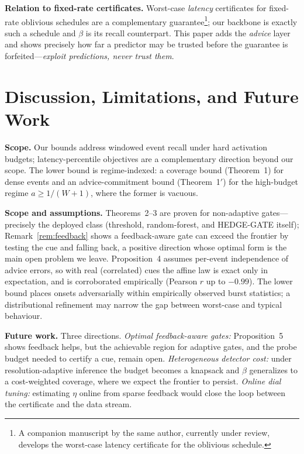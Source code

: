 ﻿\documentclass[lettersize,journal]{IEEEtran}
\begin{document}
\textbf{Relation to fixed-rate certificates.} Worst-case \emph{latency} certificates for fixed-rate oblivious schedules are a complementary guarantee\footnote{A companion manuscript by the same author, currently under review, develops the worst-case latency certificate for the oblivious schedule.}; our backbone is exactly such a schedule and $\beta$ is its recall counterpart. This paper adds the \emph{advice} layer and shows precisely how far a predictor may be trusted before the guarantee is forfeited---\emph{exploit predictions, never trust them}.


\section{Discussion, Limitations, and Future Work}\label{sec:disc}
\textbf{Scope.} Our bounds address windowed event recall under hard activation budgets; latency-percentile objectives are a complementary direction beyond our scope. The lower bound is regime-indexed: a coverage bound (Theorem~1) for dense events and an advice-commitment bound (Theorem~1$'$) for the high-budget regime $a\ge1/(W{+}1)$, where the former is vacuous.

\textbf{Scope and assumptions.} Theorems~2--3 are proven for non-adaptive gates---precisely the deployed class (threshold, random-forest, and HEDGE-GATE itself); Remark~\ref{rem:feedback} shows a feedback-aware gate can exceed the frontier by testing the cue and falling back, a positive direction whose optimal form is the main open problem we leave. Proposition~4 assumes per-event independence of advice errors, so with real (correlated) cues the affine law is exact only in expectation, and is corroborated empirically (Pearson $r$ up to $-0.99$). The lower bound places onsets adversarially within empirically observed burst statistics; a distributional refinement may narrow the gap between worst-case and typical behaviour.


\textbf{Future work.} Three directions. \emph{Optimal feedback-aware gates:} Proposition~5 shows feedback helps, but the achievable region for adaptive gates, and the probe budget needed to certify a cue, remain open. \emph{Heterogeneous detector cost:} under resolution-adaptive inference the budget becomes a knapsack and $\beta$ generalizes to a cost-weighted coverage, where we expect the frontier to persist. \emph{Online dial tuning:} estimating $\eta$ online from sparse feedback would close the loop between the certificate and the data stream.
\end{document}
